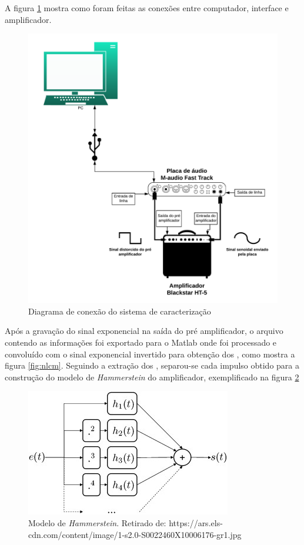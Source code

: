 A figura \ref{fig:diag} mostra como foram feitas as conexões entre computador, interface e amplificador.
\begin{figure}
	\centering
	\includegraphics[width=0.7\linewidth]{figuras/diag}
	\caption{Diagrama de conexão do sistema de caracterização}
	\label{fig:diag}
\end{figure}

Após a gravação do sinal exponencial na saída do pré amplificador, o arquivo contendo as informações foi exportado para o Matlab onde foi processado e convoluído com o sinal exponencial invertido para obtenção dos , como mostra a figura \ref{fig:nlcm}. Seguindo a extração dos , separou-se cada impulso obtido para a construção do modelo de \textit{Hammerstein} do amplificador, exemplificado na figura \ref{fig:hammer}


\begin{figure}
	\centering
	\includegraphics[width=0.5\linewidth]{figuras/hammer}
	\caption{Modelo de \textit{Hammerstein}. Retirado de: https://ars.els-cdn.com/content/image/1-s2.0-S0022460X10006176-gr1.jpg}
	\label{fig:hammer}
\end{figure}

